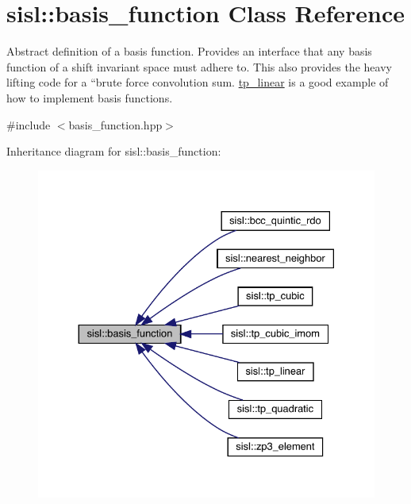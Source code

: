 \hypertarget{classsisl_1_1basis__function}{}\section{sisl\+:\+:basis\+\_\+function Class Reference}
\label{classsisl_1_1basis__function}


Abstract definition of a basis function. Provides an interface that any basis function of a shift invariant space must adhere to. This also provides the heavy lifting code for a ``brute force\textquotesingle{}\textquotesingle{} convolution sum. \hyperlink{classsisl_1_1tp__linear}{tp\+\_\+linear} is a good example of how to implement basis functions.  




{\ttfamily \#include $<$basis\+\_\+function.\+hpp$>$}



Inheritance diagram for sisl\+:\+:basis\+\_\+function\+:\nopagebreak
\begin{figure}[H]
\begin{center}
\leavevmode
\includegraphics[width=330pt]{classsisl_1_1basis__function__inherit__graph}
\end{center}
\end{figure}
